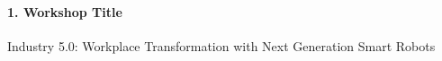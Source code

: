\documentclass{article}
\begin{document}
% 
% 

\paragraph*{1. Workshop Title} 
Industry 5.0: Workplace Transformation with Next Generation Smart Robots
\end{document}
